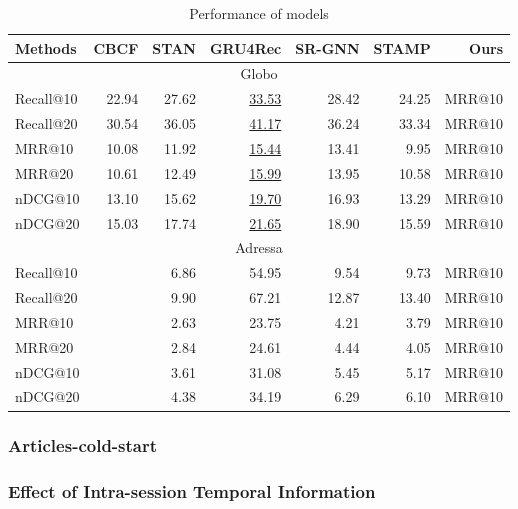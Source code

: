 \begin{table}[th]
  \caption{Performance of models}
  \label{performance-table}
  \centering
  \begin{tabular}{l|rr|rrrr}
    \toprule
     Methods & CBCF & STAN & GRU4Rec & SR-GNN & STAMP & Ours\\
    \midrule
    \multicolumn{7}{c}{Globo}\\
    \midrule
    Recall@10 & 22.94 & 27.62 & \underline{33.53} & 28.42 & 24.25  & MRR@10\\
    Recall@20 & 30.54 & 36.05 & \underline{41.17} & 36.24 & 33.34  & MRR@10 \\
    MRR@10    & 10.08 & 11.92 & \underline{15.44} & 13.41 & 9.95  & MRR@10\\
    MRR@20    & 10.61 & 12.49 & \underline{15.99} & 13.95 & 10.58  & MRR@10 \\
    nDCG@10   & 13.10 & 15.62 & \underline{19.70} & 16.93 & 13.29  & MRR@10 \\
    nDCG@20   & 15.03 & 17.74 & \underline{21.65} & 18.90 & 15.59  & MRR@10 \\
    \midrule
    \multicolumn{7}{c}{Adressa}\\
    \midrule
    Recall@10 &   & 6.86 & 54.95 & 9.54 & 9.73 &  MRR@10\\
    Recall@20 &   & 9.90 & 67.21 & 12.87 & 13.40 & MRR@10 \\
    MRR@10    &   & 2.63 & 23.75 & 4.21 & 3.79 & MRR@10\\
    MRR@20    &   & 2.84 & 24.61 & 4.44 & 4.05 & MRR@10 \\
    nDCG@10   &   & 3.61 & 31.08 & 5.45 & 5.17 & MRR@10 \\
    nDCG@20   &   & 4.38 & 34.19 & 6.29 & 6.10 & MRR@10 \\
    \bottomrule
  \end{tabular}
\end{table}
\subsubsection{Articles-cold-start}
\subsubsection{Effect of Intra-session Temporal Information}

